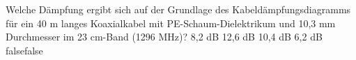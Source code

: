     {Welche Dämpfung ergibt sich auf der Grundlage des Kabeldämpfungsdiagramms für ein 40 m langes Koaxialkabel mit PE-Schaum-Dielektrikum und 10,3 mm Durchmesser im 23 cm-Band (1296 MHz)?}
    {8,2 dB}
    {12,6 dB}
    {10,4 dB}
    {6,2 dB}
    {false}{false}